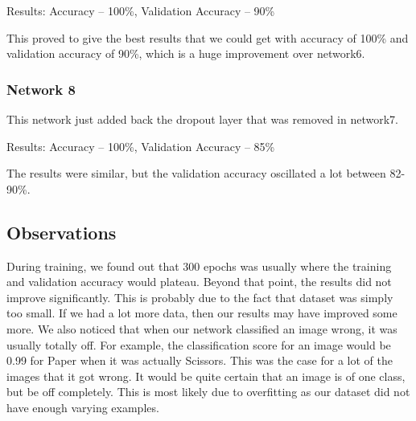 Results: Accuracy – 100\%, Validation Accuracy – 90\%

This proved to give the best results that we could get with accuracy of 100\% and validation accuracy of 90\%, which is a huge improvement over network6.
\subsubsection{Network 8}

This network just added back the dropout layer that was removed in network7.

Results: Accuracy – 100\%, Validation Accuracy – 85\%

The results were similar, but the validation accuracy oscillated a lot between 82-90\%.
\subsection{Observations}
During training, we found out that 300 epochs was usually where the training and validation accuracy would plateau. Beyond that point, the results did not improve significantly. This is probably due to the fact that dataset was simply too small. If we had a lot more data, then our results may have improved some more.
We also noticed that when our network classified an image wrong, it was usually totally off. For example, the classification score for an image would be 0.99 for Paper when it was actually Scissors. This was the case for a lot of the images that it got wrong. It would be quite certain that an image is of one class, but be off completely. This is most likely due to overfitting as our dataset did not have enough varying examples.
